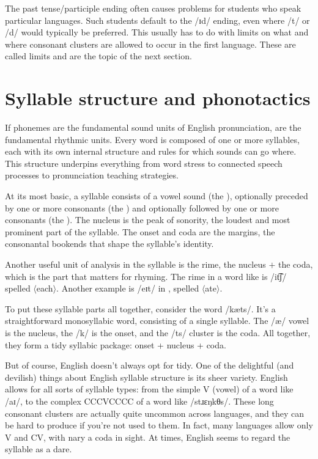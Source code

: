 The past tense/participle  ending often causes problems for students who speak particular languages. Such students default to the /ɪd/ ending, even where /t/ or /d/ would typically be preferred. This usually has to do with limits on what and where consonant clusters are allowed to occur in the first language. These are called  limits and are the topic of the next section.

\section{Syllable structure and phonotactics} \label{sec:phonotactics}

If phonemes are the fundamental sound units of English pronunciation,  are the fundamental rhythmic units. Every word is composed of one or more syllables, each with its own internal structure and rules for which sounds can go where. This structure underpins everything from word stress to connected speech processes to pronunciation teaching strategies.

At its most basic, a syllable consists of a vowel sound (the ), optionally preceded by one or more consonants (the ) and optionally followed by one or more consonants (the ). The nucleus is the peak of sonority, the loudest and most prominent part of the syllable. The onset and coda are the margins, the consonantal bookends that shape the syllable's identity.

Another useful unit of analysis in the syllable is the rime, the nucleus $+$ the coda, which is the part that matters for rhyming. The rime in a word like  is /it͡ʃ/ spelled $\langle$each$\rangle$. Another example is /eɪt/ in , spelled $\langle$ate$\rangle$.

To put these syllable parts all together, consider the word  /kæts/. It's a straightforward monosyllabic word, consisting of a single syllable. The /æ/ vowel is the nucleus, the /k/ is the onset, and the /ts/ cluster is the coda. All together, they form a tidy syllabic package: onset + nucleus + coda.

But of course, English doesn't always opt for tidy. One of the delightful (and devilish) things about English syllable structure is its sheer variety. English allows for all sorts of syllable types: from the simple V (vowel) of a word like  /aɪ/, to the complex CCCVCCCC of a word like  /stɹɛŋkθs/. These long consonant clusters are actually quite uncommon across languages, and they can be hard to produce if you're not used to them. In fact, many languages allow only V and CV, with nary a coda in sight. At times, English seems to regard the syllable as a dare.

